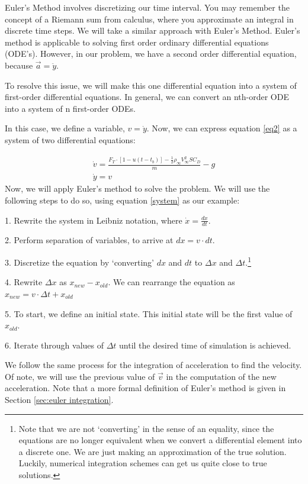 \documentclass[12pt]{report}
\begin{document}
Euler’s Method involves discretizing our time interval. You may remember the concept of a Riemann sum from calculus, where you approximate an integral in discrete time steps. We will take a similar approach with Euler’s Method. Euler’s method is applicable to solving first order ordinary differential equations (ODE’s). However, in our problem, we have a second order differential equation, because $\vec{a}=\ddot{y}$.

To resolve this issue, we will make this one differential equation into a system of first-order differential equations. In general, we can convert an nth-order ODE into a system of n first-order ODEs.

In this case, we define a variable, $v=\dot{y}$. Now, we can express equation \eqref{eq2} as a system of two differential equations:

\begin{gather}\label{system}
        \dot{v}=\frac{F_T \cdot [1-u(t-t_b)]-\frac{1}{2}\rho_{\infty}V_{\infty}^2SC_D}{m}-g\\
    \dot{y}=v
\end{gather}
Now, we will apply Euler’s method to solve the problem. We will use the following steps to do so, using equation \eqref{system} as our example:

1. Rewrite the system in Leibniz notation, where $\dot{x}=\frac{dx}{dt}$.

2. Perform separation of variables, to arrive at $dx=v\cdot dt$.

3. Discretize the equation by ‘converting’  $dx$ and $dt$ to $\Delta x$ and $\Delta t$.\footnote{Note that we are not ‘converting’ in the sense of an equality, since the equations are no longer equivalent when we convert a differential element into a discrete one. We are just making an approximation of the true solution. Luckily, numerical integration schemes can get us quite close to true solutions. }

4. Rewrite $\Delta x$ as $x_{new}-x_{old}$. We can rearrange the equation as $x_{new}=v\cdot \Delta t + x_{old}$

5. To start, we define an initial state. This initial state will be the first value of $x_{old}$. 

6. Iterate through values of $\Delta t$ until the desired time of simulation is achieved.

We follow the same process for the integration of acceleration to find the velocity. Of note, we will use the previous value of $\vec{v}$ in the computation of the new acceleration. Note that a more formal definition of Euler’s method is given in Section \ref{sec:euler integration}.
\end{document}
